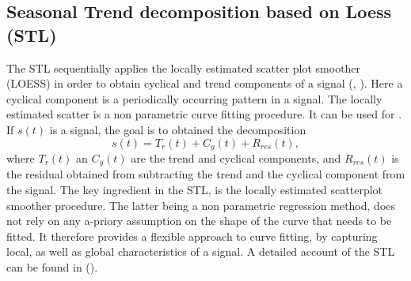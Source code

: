 \documentclass[../Main/thesis.tex]{subfiles}
\begin{document}
\justify
\subsection{Seasonal Trend decomposition based on Loess (STL)}
The STL sequentially applies the locally estimated scatter plot smoother (LOESS) in order to obtain cyclical and trend components of a signal (\cite{Cleveland-1979}, \cite{Cleveland-et-al-1988}). Here a cyclical component is a periodically occurring pattern in a signal. The  locally estimated scatter is a non parametric curve fitting procedure.  It can be used for .
If $s(t)$ is a signal, the goal is to obtained the decomposition 
\begin{equation}
s(t) = T_{r}(t) + C_{y}(t) + R_{res}(t),
\end{equation} 
where $T_{r}(t)$ an $C_{y}(t)$ are the trend and cyclical components, and $R_{res}(t)$ is the residual obtained from subtracting  the trend and the cyclical component from the signal. The key ingredient in the STL, is the locally estimated scatterplot smoother procedure. The latter being a non parametric regression method, does not rely on any a-priory assumption on the shape of the curve that needs to be fitted. It therefore provides a flexible approach to curve fitting, by capturing local, as well as global characteristics of a signal. A detailed account of the STL can be found in  (\cite{Cleveland-et-al-1990}).
\justify
\end{document}
